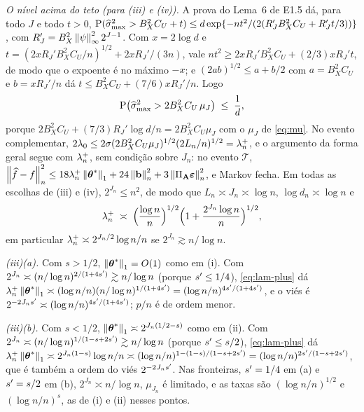 \documentclass[11pt,a4paper]{article}
\newcommand{\Amat}{\mathbf{A}}
\newcommand{\PA}{\Pi_{\Amat}}
\newcommand{\bveps}{\boldsymbol{\varepsilon}}
\newcommand{\bb}{\mathbf{b}}
\newcommand{\smax}{\widehat{\sigma}_{\max}}
\begin{document}
\emph{O nível acima do teto (para (iii) e (iv)).} A prova do Lema~6 de E1.5
dá, para todo $J$ e todo $t > 0$, $\Prob(\smax^{2} > B_{X}^{2}C_{U} + t) \le
d\exp\{-nt^{2}/(2(R_{J}'B_{X}^{2}C_{U} + R_{J}'t/3))\}$, com $R_{J}' =
B_{X}^{2}\left\lVert \psi \right\rVert_{\infty}^{2}2^{J-1}$. Com $x = 2\log d$ e $t =
(2xR_{J}'B_{X}^{2}C_{U}/n)^{1/2} + 2xR_{J}'/(3n)$, vale $nt^{2} \ge
2xR_{J}'B_{X}^{2}C_{U} + (2/3)xR_{J}'t$, de modo que o expoente é no máximo
$-x$; e $(2ab)^{1/2} \le a + b/2$ com $a = B_{X}^{2}C_{U}$ e $b =
xR_{J}'/n$ dá $t \le B_{X}^{2}C_{U} + (7/6)xR_{J}'/n$. Logo
\begin{equation}
  \label{eq:smax-teto}
  \Prob\bigl(\smax^{2} > 2B_{X}^{2}C_{U}\,\mu_{J}\bigr) \;\le\; \frac{1}{d},
\end{equation}
porque $2B_{X}^{2}C_{U} + (7/3)R_{J}'\log d/n = 2B_{X}^{2}C_{U}\mu_{J}$ com o
$\mu_{J}$ de \eqref{eq:mu}. No evento complementar, $2\lambda_{0} \le
2\sigma(2B_{X}^{2}C_{U}\mu_{J})^{1/2}(2L_{n}/n)^{1/2} = \lambda_{n}^{+}$, e o
argumento da forma geral segue com $\lambda_{n}^{+}$, sem condição sobre
$J_{n}$: no evento $\mathcal{T}$, $\normn{\widehat f - f}^{2} \le
18\pen_{n}^{+}\norm{\thetastar}_{1} + 24\normn{\bb}^{2} +
3\normn{\PA\bveps}^{2}$, e Markov fecha. Em todas as escolhas de (iii) e
(iv), $2^{J_{n}} \le n^{2}$, de modo que $L_{n} \asymp J_{n} \asymp \log n$,
$\log d_{n} \asymp \log n$ e
\begin{equation}
  \label{eq:lam-plus}
  \lambda_{n}^{+} \;\asymp\; \Bigl(\frac{\log n}{n}\Bigr)^{1/2}
  \Bigl(1 + \frac{2^{J_{n}}\log n}{n}\Bigr)^{1/2},
\end{equation}
em particular $\lambda_{n}^{+} \asymp 2^{J_{n}/2}\log n/n$ se $2^{J_{n}} \gtrsim
n/\log n$.

\emph{(iii)(a).} Com $s > 1/2$, $\left\lVert \boldsymbol{\theta}^{*} \right\rVert_{1} = O(1)$ como em (i).
Com $2^{J_{n}} \asymp (n/\log n)^{2/(1+4s')} \gtrsim n/\log n$ (porque
$s' \le 1/4$), \eqref{eq:lam-plus} dá $\lambda_{n}^{+}\left\lVert \boldsymbol{\theta}^{*} \right\rVert_{1}
\asymp (\log n/n)(n/\log n)^{1/(1+4s')} = (\log n/n)^{4s'/(1+4s')}$,
e o viés é $2^{-2J_{n}s'} \asymp (\log n/n)^{4s'/(1+4s')}$; $p/n$ é
de ordem menor.

\emph{(iii)(b).} Com $s < 1/2$, $\left\lVert \boldsymbol{\theta}^{*} \right\rVert_{1} \asymp
2^{J_{n}(1/2-s)}$ como em (ii). Com $2^{J_{n}} \asymp
(n/\log n)^{1/(1-s+2s')} \gtrsim n/\log n$ (porque $s' \le s/2$),
\eqref{eq:lam-plus} dá $\lambda_{n}^{+}\left\lVert \boldsymbol{\theta}^{*} \right\rVert_{1} \asymp
2^{J_{n}(1-s)}\log n/n \asymp (\log n/n)^{1 - (1-s)/(1-s+2s')} =
(\log n/n)^{2s'/(1-s+2s')}$, que é também a ordem do viés
$2^{-2J_{n}s'}$. Nas fronteiras, $s' = 1/4$ em (a) e $s' = s/2$ em
(b), $2^{J_{n}} \asymp n/\log n$, $\mu_{J_{n}}$ é limitado, e as taxas são
$(\log n/n)^{1/2}$ e $(\log n/n)^{s}$, as de (i) e (ii) nesses pontos.
\end{document}
